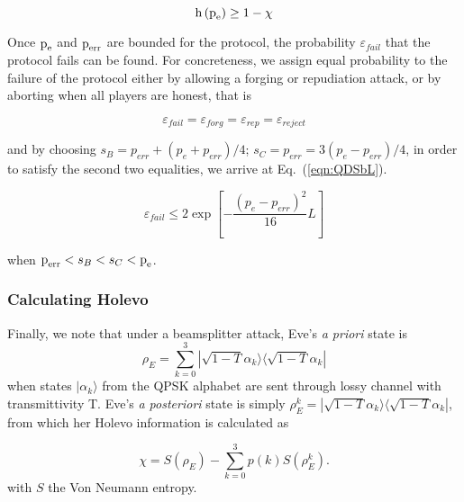 \begin{equation}
\text{h}\left(\text{p}_{\text{e}}\right) \ge 1 - \chi
\end{equation}

\noindent {}

Once $\text{p}_{\text{e}}$ and $\text{p}_{\text{err}}$ are bounded for the protocol, the probability $\varepsilon_{fail}$ that the protocol fails can be found. For concreteness, we assign equal probability to the failure of the protocol either by allowing a forging or repudiation attack, or by aborting when all players are honest, that is

\begin{equation*}
\varepsilon_{fail} = \varepsilon_{forg} = \varepsilon_{rep} = \varepsilon_{reject}
\end{equation*}

\noindent and by choosing $s_B = p_{err} + \left(p_e + p_{err}\right)/4$; $s_C = p_{err} = 3\left(p_e - p_{err}\right)/4$, in order to satisfy the second two equalities, we arrive at Eq.~(\ref{eqn:QDSbL}).

\begin{equation}
\varepsilon_{fail} \le 2 \exp \left[ - \frac{\left( p_e - p_{err} \right)^2}{16} L \right]
\end{equation}

\noindent when $\text{p}_{\text{err}}< s_B < s_C < \text{p}_{\text{e}}$.

\subsubsection{Calculating Holevo}

Finally, we note that under a beamsplitter attack, Eve's \emph{a priori} state is
\begin{equation}
\rho_E = \sum_{k=0}^3 |\sqrt{1-T}\alpha_k\rangle\langle\sqrt{1-T}\alpha_k|
\end{equation}
when states $|\alpha_k\rangle$ from the QPSK alphabet are sent through lossy channel with transmittivity T. Eve's \emph{a posteriori} state is simply $\rho_{E}^k = |\sqrt{1-T}\alpha_k\rangle\langle \sqrt{1-T}\alpha_k|$, from which her Holevo information is calculated as

\begin{equation}
\chi = S\left(\rho_E\right) - \sum_{k=0}^3 p\left(k\right) S\left(\rho_E^k\right).
\end{equation}
with $S$ the Von Neumann entropy.



